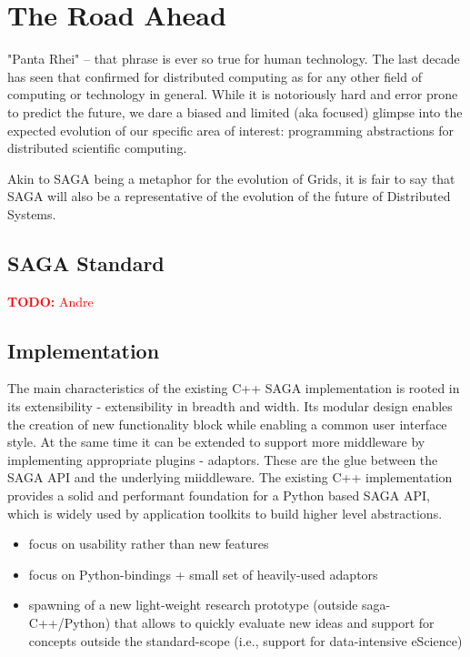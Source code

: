 \documentclass{article}
\newcommand{\B}[1]{\textbf{#1}}
\newcommand{\todo}[1]{{\textcolor{red}{\B{TODO:} #1 }}}
\begin{document}
\section{The Road Ahead}
\label{sec:road}

  "Panta Rhei" -- that phrase is ever so true for human technology.
  The last decade has seen that confirmed for distributed computing as
  for any other field of computing or technology in general.  While it
  is notoriously hard and error prone to predict the future, we dare a
  biased and limited (aka focused) glimpse into the expected evolution
  of our specific area of interest: programming abstractions for
  distributed scientific computing. 

  Akin to SAGA being a metaphor for the evolution of Grids, it is fair
  to say that SAGA will also be a representative of the evolution of
  the future of Distributed Systems.

\subsection{SAGA Standard}

\todo{Andre}

\subsection{Implementation}

The main characteristics of the existing C++ SAGA implementation is rooted in its
extensibility - extensibility in breadth and width. Its modular design enables the
creation of new functionality block while enabling a common user interface style.
At the same time it can be extended to support more middleware by implementing
appropriate plugins - adaptors. These are the glue between the SAGA API and 
the underlying miiddleware. The existing C++ implementation provides a solid 
and performant foundation for a Python based SAGA API, which is widely used 
by application toolkits to build higher level abstractions.

\begin{itemize}
\item focus on usability rather than new features
\item focus on Python-bindings + small set of heavily-used adaptors
\item spawning of a new light-weight research prototype (outside saga-C++/Python) that allows to quickly evaluate new ideas and support for concepts outside the standard-scope (i.e., support for data-intensive eScience)
\end{itemize}
\end{document}
